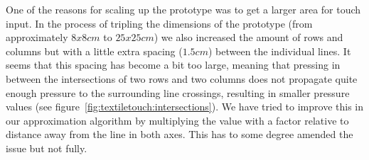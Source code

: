 One of the reasons for scaling up the prototype was to get a larger area for touch input.
In the process of tripling the dimensions of the prototype (from approximately \(8x8cm\) to \(25x25cm\)) we also increased the amount of rows and columns but with a little extra spacing (\(1.5cm\)) between the individual lines.
It seems that this spacing has become a bit too large, meaning that pressing in between the intersections of two rows and two columns does not propagate quite enough pressure to the surrounding line crossings, resulting in smaller pressure values (see figure~\ref{fig:textiletouch:intersections}).
We have tried to improve this in our approximation algorithm by multiplying the value with a factor relative to distance away from the line in both axes.
This has to some degree amended the issue but not fully.

